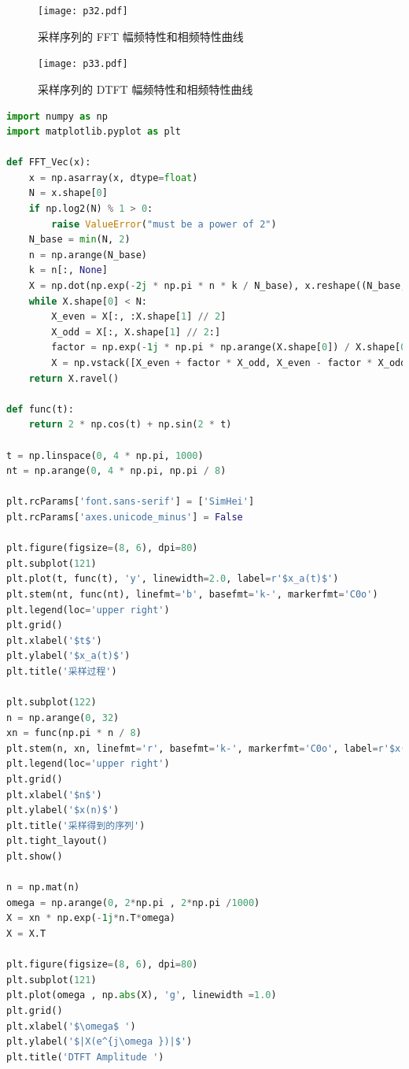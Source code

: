 \documentclass[12pt,AutoFakeBold]{article}
\begin{document}
\begin{figure}[hbtp]
	\centering
	\texttt{[image: p32.pdf]}
	\caption{采样序列的 FFT 幅频特性和相频特性曲线} \label{fig:p32}
\end{figure}

\begin{figure}[hbtp]
	\centering
	\texttt{[image: p33.pdf]}
	\caption{采样序列的 DTFT 幅频特性和相频特性曲线} \label{fig:p33}
\end{figure}

\begin{lstlisting}[language=Python]
import numpy as np
import matplotlib.pyplot as plt

def FFT_Vec(x):
	x = np.asarray(x, dtype=float)
	N = x.shape[0]
	if np.log2(N) % 1 > 0:
		raise ValueError("must be a power of 2")
	N_base = min(N, 2)
	n = np.arange(N_base)
	k = n[:, None]
	X = np.dot(np.exp(-2j * np.pi * n * k / N_base), x.reshape((N_base, -1)))
	while X.shape[0] < N:
		X_even = X[:, :X.shape[1] // 2]
		X_odd = X[:, X.shape[1] // 2:]
		factor = np.exp(-1j * np.pi * np.arange(X.shape[0]) / X.shape[0])[:, None]
		X = np.vstack([X_even + factor * X_odd, X_even - factor * X_odd])
	return X.ravel()

def func(t):
	return 2 * np.cos(t) + np.sin(2 * t)

t = np.linspace(0, 4 * np.pi, 1000)
nt = np.arange(0, 4 * np.pi, np.pi / 8)

plt.rcParams['font.sans-serif'] = ['SimHei']
plt.rcParams['axes.unicode_minus'] = False

plt.figure(figsize=(8, 6), dpi=80)
plt.subplot(121)
plt.plot(t, func(t), 'y', linewidth=2.0, label=r'$x_a(t)$')
plt.stem(nt, func(nt), linefmt='b', basefmt='k-', markerfmt='C0o')
plt.legend(loc='upper right')
plt.grid()
plt.xlabel('$t$')
plt.ylabel('$x_a(t)$')
plt.title('采样过程')

plt.subplot(122)
n = np.arange(0, 32)
xn = func(np.pi * n / 8)
plt.stem(n, xn, linefmt='r', basefmt='k-', markerfmt='C0o', label=r'$x(n)$')
plt.legend(loc='upper right')
plt.grid()
plt.xlabel('$n$')
plt.ylabel('$x(n)$')
plt.title('采样得到的序列')
plt.tight_layout()
plt.show()

n = np.mat(n)
omega = np.arange(0, 2*np.pi , 2*np.pi /1000)
X = xn * np.exp(-1j*n.T*omega)
X = X.T

plt.figure(figsize=(8, 6), dpi=80)
plt.subplot(121)
plt.plot(omega , np.abs(X), 'g', linewidth =1.0)
plt.grid()
plt.xlabel('$\omega$ ')
plt.ylabel('$|X(e^{j\omega })|$')
plt.title('DTFT Amplitude ')


\end{lstlisting}
\end{document}
